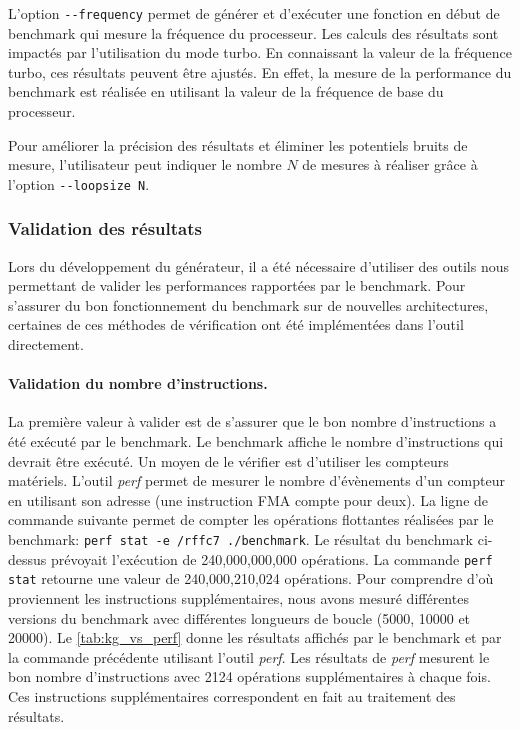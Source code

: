             L'option \verb|--frequency| permet de générer et d'exécuter une fonction en début de benchmark qui mesure la fréquence du processeur. Les calculs des résultats sont impactés par l'utilisation du mode turbo. En connaissant la valeur de la fréquence turbo, ces résultats peuvent être ajustés. En effet, la mesure de la performance du benchmark est réalisée en utilisant la valeur de la fréquence de base du processeur. 
            
            Pour améliorer la précision des résultats et éliminer les potentiels bruits de mesure, l'utilisateur peut indiquer le nombre $N$ de mesures à réaliser grâce à l'option \verb|--loopsize N|.    
    
    
    \subsubsection{Validation des résultats}
    
        Lors du développement du générateur, il a été nécessaire d'utiliser des outils nous permettant de valider les performances rapportées par le benchmark. Pour s'assurer du bon fonctionnement du benchmark sur de nouvelles architectures, certaines de ces méthodes de vérification ont été implémentées dans l'outil directement. 
        
        
        \paragraph{Validation du nombre d'instructions.} La première valeur à valider est de s'assurer que le bon nombre d'instructions a été exécuté par le benchmark. Le benchmark affiche le nombre d'instructions qui devrait être exécuté. Un moyen de le vérifier est d'utiliser les compteurs matériels. L'outil \textit{perf} permet de mesurer le nombre d'évènements d'un compteur en utilisant son adresse (une instruction FMA compte pour deux). La ligne de commande suivante permet de compter les opérations flottantes réalisées par le benchmark: \verb|perf stat -e /rffc7 ./benchmark|. Le résultat du benchmark ci-dessus prévoyait l'exécution de 240,000,000,000 opérations. La commande \verb|perf stat| retourne une valeur de 240,000,210,024 opérations. Pour comprendre d'où proviennent les instructions supplémentaires, nous avons mesuré différentes versions du benchmark avec différentes longueurs de boucle (5000, 10000 et 20000). Le \autoref{tab:kg_vs_perf} donne les résultats affichés par le benchmark et par la commande précédente utilisant l'outil \textit{perf}. Les résultats de \textit{perf} mesurent le bon nombre d'instructions avec 2124 opérations supplémentaires à chaque fois. Ces instructions supplémentaires correspondent en fait au traitement des résultats.
    

